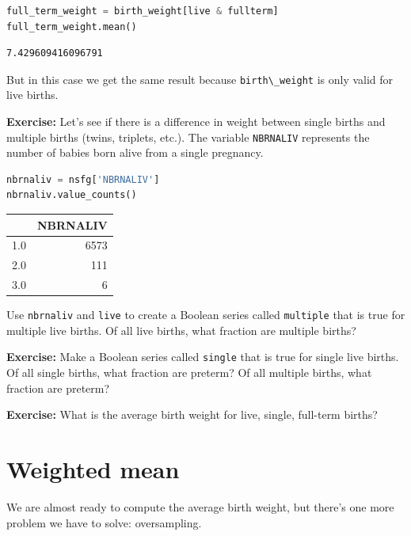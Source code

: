 \begin{lstlisting}[language=Python,style=source]
full_term_weight = birth_weight[live & fullterm]
full_term_weight.mean()
\end{lstlisting}

\begin{lstlisting}[style=output]
7.429609416096791
\end{lstlisting}

But in this case we get the same result because
\passthrough{\lstinline!birth\_weight!} is only valid for live births.

\textbf{Exercise:} Let's see if there is a difference in weight between
single births and multiple births (twins, triplets, etc.). The variable
\passthrough{\lstinline!NBRNALIV!} represents the number of babies born
alive from a single pregnancy.

\begin{lstlisting}[language=Python,style=source]
nbrnaliv = nsfg['NBRNALIV']
nbrnaliv.value_counts()
\end{lstlisting}

\begin{tabular}{lr}
\toprule
{} &  NBRNALIV \\
\midrule
1.0 &      6573 \\
2.0 &       111 \\
3.0 &         6 \\
\bottomrule
\end{tabular}

Use \passthrough{\lstinline!nbrnaliv!} and
\passthrough{\lstinline!live!} to create a Boolean series called
\passthrough{\lstinline!multiple!} that is true for multiple live
births. Of all live births, what fraction are multiple births?

\textbf{Exercise:} Make a Boolean series called
\passthrough{\lstinline!single!} that is true for single live births. Of
all single births, what fraction are preterm? Of all multiple births,
what fraction are preterm?

\textbf{Exercise:} What is the average birth weight for live, single,
full-term births?

\hypertarget{weighted-mean}{%
\section{Weighted mean}\label{weighted-mean}}

We are almost ready to compute the average birth weight, but there's one
more problem we have to solve: oversampling.

